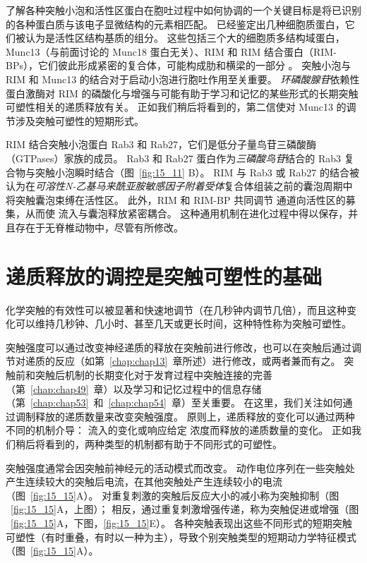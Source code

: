 了解各种突触小泡和活性区蛋白在胞吐过程中如何协调的一个关键目标是将已识别的各种蛋白质与该电子显微结构的元素相匹配。
已经鉴定出几种细胞质蛋白，它们被认为是活性区结构基质的组分。
这些包括三个大的细胞质多结构域蛋白，Munc13（与前面讨论的 Munc18 蛋白无关）、RIM 和 RIM 结合蛋白（RIM-BPs），它们彼此形成紧密的复合体，可能构成肋和横梁的一部分 。
突触小泡与 RIM 和 Munc13 的结合对于启动小泡进行胞吐作用至关重要。
\textit{环磷酸腺苷}依赖性蛋白激酶对 RIM 的磷酸化与增强与可能有助于学习和记忆的某些形式的长期突触可塑性相关的递质释放有关。
正如我们稍后将看到的，第二信使对 Munc13 的调节涉及突触可塑性的短期形式。


RIM 结合突触小泡蛋白 Rab3 和 Rab27，它们是低分子量鸟苷三磷酸酶（GTPases）家族的成员。
Rab3 和 Rab27 蛋白作为\textit{三磷酸鸟苷}结合的 Rab3 复合物与突触小泡瞬时结合（图~\ref{fig:15_11} B）。
RIM 与 Rab3 或 Rab27 的结合被认为在\textit{可溶性N-乙基马来酰亚胺敏感因子附着受体}复合体组装之前的囊泡周期中将突触囊泡束缚在活性区。
此外，RIM 和 RIM-BP 共同调节  通道向活性区的募集，从而使  流入与囊泡释放紧密耦合。
这种通用机制在进化过程中得以保存，并且存在于无脊椎动物中，尽管有所修改。



\section{递质释放的调控是突触可塑性的基础}

化学突触的有效性可以被显著和快速地调节（在几秒钟内调节几倍），而且这种变化可以维持几秒钟、几小时、甚至几天或更长时间，这种特性称为突触可塑性。


突触强度可以通过改变神经递质的释放在突触前进行修改，也可以在突触后通过调节对递质的反应（如第~\ref{chap:chap13}~章所述）进行修改，或两者兼而有之。
突触前和突触后机制的长期变化对于发育过程中突触连接的完善（第~\ref{chap:chap49}~章）以及学习和记忆过程中的信息存储（第~\ref{chap:chap53}~和~\ref{chap:chap54}~章）至关重要。
在这里，我们关注如何通过调制释放的递质数量来改变突触强度。
原则上，递质释放的变化可以通过两种不同的机制介导： 流入的变化或响应给定  浓度而释放的递质数量的变化。
正如我们稍后将看到的，两种类型的机制都有助于不同形式的可塑性。


突触强度通常会因突触前神经元的活动模式而改变。
动作电位序列在一些突触处产生连续较大的突触后电流，在其他突触处产生连续较小的电流（图~\ref{fig:15_15}A）。
对重复刺激的突触后反应大小的减小称为突触抑制（图 ~\ref{fig:15_15}A，上图）；
相反，通过重复刺激增强传递，称为突触促进或增强（图 ~\ref{fig:15_15}A，下图，\ref{fig:15_15}E）。
各种突触表现出这些不同形式的短期突触可塑性（有时重叠，有时以一种为主），导致个别突触类型的短期动力学特征模式（图~\ref{fig:15_15}A）。


